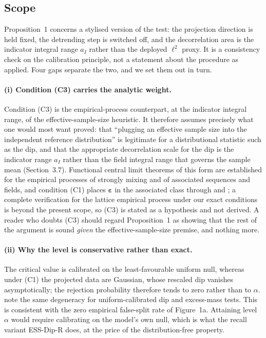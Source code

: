\documentclass[11pt]{article}
\begin{document}
\subsection*{Scope}

Proposition~1 concerns a stylised version of the test: the projection direction
is held fixed, the detrending step is switched off, and the decorrelation area
is the indicator integral range $a_I$ rather than the deployed $\ell^{2}$
proxy. It is a consistency check on the calibration principle, not a statement
about the procedure as applied. Four gaps separate the two, and we set them out
in turn.

\paragraph{(i) Condition (C3) carries the analytic weight.}
Condition (C3) is the empirical-process counterpart, at the indicator integral
range, of the effective-sample-size heuristic. It therefore assumes precisely
what one would most want proved: that ``plugging an effective sample size into
the independent reference distribution'' is legitimate for a distributional
statistic such as the dip, and that the appropriate decorrelation scale for the
dip is the indicator range $a_I$ rather than the field integral range that
governs the sample mean (Section~3.7). Functional central limit theorems of
this form are established for the empirical processes of strongly mixing and of
associated sequences and fields, and condition (C1) places $\bm\varepsilon$ in
the associated class through \citet{Pitt1982} and
\citet{BulinskiShashkin2007}; a complete verification for the lattice empirical
process under our exact conditions is beyond the present scope, so (C3) is
stated as a hypothesis and not derived. A reader who doubts (C3) should regard
Proposition~1 as showing that the rest of the argument is sound \emph{given}
the effective-sample-size premise, and nothing more.

\paragraph{(ii) Why the level is conservative rather than exact.}
The critical value is calibrated on the least-favourable uniform null, whereas
under (C1) the projected data are Gaussian, whose rescaled dip vanishes
asymptotically; the rejection probability therefore tends to zero rather than
to $\alpha$. \citet{ChengHall1998} note the same degeneracy for
uniform-calibrated dip and excess-mass tests. This is consistent with the zero
empirical false-split rate of Figure~1a. Attaining level $\alpha$ would require
calibrating on the model's own null, which is what the recall variant
ESS-Dip-R does, at the price of the distribution-free property.
\end{document}
